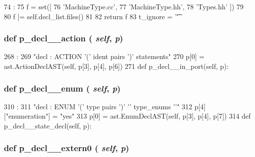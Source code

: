 \begin{DoxyCode}
74                    :
75         f = set([
76             'MachineType.cc',
77             'MachineType.hh',
78             'Types.hh' ])
79 
80         f |= self.decl_list.files()
81 
82         return f
83 
    t_ignore = '\t '
\end{DoxyCode}
\hypertarget{classslicc_1_1parser_1_1SLICC_a754f55e980ee380f1a769021e576b057}{
\subsubsection[{p\_\-decl\_\-\_\-action}]{\setlength{\rightskip}{0pt plus 5cm}def p\_\-decl\_\-\_\-action ( {\em self}, \/   {\em p})}}
\label{classslicc_1_1parser_1_1SLICC_a754f55e980ee380f1a769021e576b057}



\begin{DoxyCode}
268                                :
269         "decl : ACTION '(' ident pairs ')' statements"
270         p[0] = ast.ActionDeclAST(self, p[3], p[4], p[6])
271 
    def p_decl__in_port(self, p):
\end{DoxyCode}
\hypertarget{classslicc_1_1parser_1_1SLICC_adcab24cfeebb754dc1256bf854e6feb7}{
\subsubsection[{p\_\-decl\_\-\_\-enum}]{\setlength{\rightskip}{0pt plus 5cm}def p\_\-decl\_\-\_\-enum ( {\em self}, \/   {\em p})}}
\label{classslicc_1_1parser_1_1SLICC_adcab24cfeebb754dc1256bf854e6feb7}



\begin{DoxyCode}
310                              :
311         "decl : ENUM '(' type pairs ')' '{' type_enums   '}'"
312         p[4]["enumeration"] = "yes"
313         p[0] = ast.EnumDeclAST(self, p[3], p[4], p[7])
314 
    def p_decl__state_decl(self, p):
\end{DoxyCode}
\hypertarget{classslicc_1_1parser_1_1SLICC_a1149814a75ebc184143d879b4d3193e9}{
\subsubsection[{p\_\-decl\_\-\_\-extern0}]{\setlength{\rightskip}{0pt plus 5cm}def p\_\-decl\_\-\_\-extern0 ( {\em self}, \/   {\em p})}}
\label{classslicc_1_1parser_1_1SLICC_a1149814a75ebc184143d879b4d3193e9}



